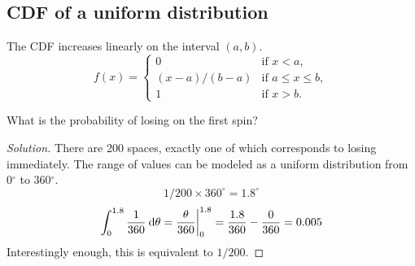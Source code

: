 \documentclass[12pt,letterpaper]{article}
\begin{document}
\subsection{CDF of a uniform distribution}
The CDF increases linearly on the interval $(a,b)$.
\begin{equation*}
f(x)=
\begin{cases}
0 & \text{if } x < a,\\
(x-a)/(b-a) & \text{if } a \leq x \leq b,\\
1 & \text{if } x > b.
\end{cases}
\end{equation*}
\begin{problem}
What is the probability of losing on the first spin?
\begin{proof}[Solution]
There are 200 spaces,
exactly one of which corresponds to losing immediately.
The range of values can be modeled as a uniform distribution from 0$^\circ$ to 360$^\circ$.
\begin{equation*}
1/200 \times 360^\circ = 1.8^\circ
\end{equation*}
\begin{equation}
\int_0^{1.8} \frac{1}{360} \:\mathrm{d}\theta
= \frac{\theta}{360} \bigg|_0^{1.8}  = \frac{1.8}{360} - \frac{0}{360} = 0.005
\end{equation}
Interestingly enough, this is equivalent to $1/200$.
\end{proof}
\end{problem}
\end{document}
